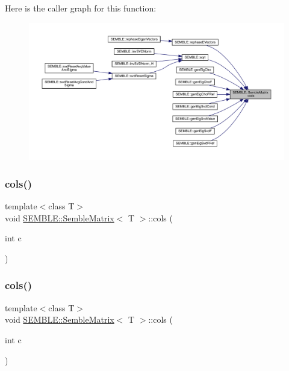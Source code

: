 Here is the caller graph for this function\+:
\nopagebreak
\begin{figure}[H]
\begin{center}
\leavevmode
\includegraphics[width=350pt]{df/d87/structSEMBLE_1_1SembleMatrix_af0d467ec8fe85b4947556ad5d25bcda0_icgraph}
\end{center}
\end{figure}
\mbox{\label{structSEMBLE_1_1SembleMatrix_a06252460e771d092f72f9d7dfee55084}} 
\subsubsection{\texorpdfstring{cols()}{cols()}\hspace{0.1cm}{\footnotesize\ttfamily [3/4]}}
{\footnotesize\ttfamily template$<$class T$>$ \\
void \mbox{\hyperlink{structSEMBLE_1_1SembleMatrix}{S\+E\+M\+B\+L\+E\+::\+Semble\+Matrix}}$<$ T $>$\+::cols (\begin{DoxyParamCaption}\item[{int}]{c }\end{DoxyParamCaption})\hspace{0.3cm}{\ttfamily [inline]}}

\mbox{\label{structSEMBLE_1_1SembleMatrix_a06252460e771d092f72f9d7dfee55084}} 
\subsubsection{\texorpdfstring{cols()}{cols()}\hspace{0.1cm}{\footnotesize\ttfamily [4/4]}}
{\footnotesize\ttfamily template$<$class T$>$ \\
void \mbox{\hyperlink{structSEMBLE_1_1SembleMatrix}{S\+E\+M\+B\+L\+E\+::\+Semble\+Matrix}}$<$ T $>$\+::cols (\begin{DoxyParamCaption}\item[{int}]{c }\end{DoxyParamCaption})\hspace{0.3cm}{\ttfamily [inline]}}

